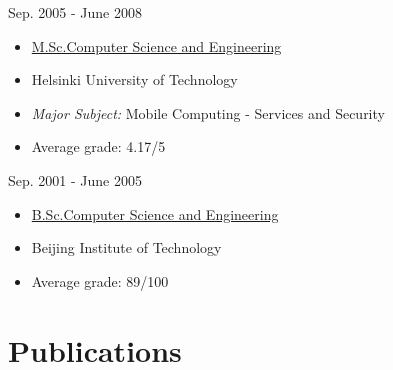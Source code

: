 \documentclass[a4paper]{twentysecondcv} %
\begin{document}
\begin{minipage}{0.15\linewidth}
  Sep. 2005 - June 2008
\end{minipage}\hfill
\begin{minipage}{0.85\linewidth}
  {\small
    \begin{itemize}
    \item \underline{M.Sc.Computer Science and Engineering}
    \item Helsinki University of Technology
    \item {\it Major Subject:} Mobile Computing - Services and Security
    \item Average grade: 4.17/5
    \end{itemize}
  }
\end{minipage}
\vspace{2mm}

\begin{minipage}{0.15\linewidth}
  Sep. 2001 - June 2005
\end{minipage}\hfill
\begin{minipage}{0.85\linewidth}
  {\small
  \begin{itemize}
  \item \underline{B.Sc.Computer Science and Engineering}
  \item Beijing Institute of Technology
  \item Average grade: 89/100
  \end{itemize}
  }
\end{minipage}



\section{Publications}
\end{document}
